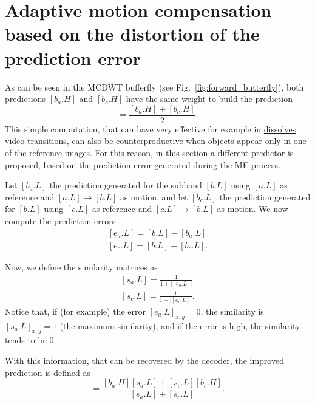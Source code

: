
\section{Adaptive motion compensation based on the distortion of the prediction error}

As can be seen in the MCDWT bufferfly (see
Fig.~\ref{fig:forward_butterfly}), both predictions $[b_a.H]$ and
$[b_c.H]$ have the same weight to build the prediction
\begin{equation}
  [\hat{b.H}] = \frac{[b_a.H] + [b_c.H]}{2}.
\end{equation}
This simple computation, that can have very effective for example in
\href{https://biteable.com/blog/tips/video-transitions-effects-examples/}{dissolves}
video transitions, can also be counterproductive when objects appear
only in one of the reference images. For this reason, in this section
a different predictor is proposed, based on the prediction error
generated during the ME process.

Let $[b_a.L]$ the prediction generated for the subband $[b.L]$ using
$[a.L]$ as reference and $[a.L]\rightarrow [b.L]$ as motion, and let
$[b_c.L]$ the prediction generated for $[b.L]$ using $[c.L]$ as
reference and $[c.L]\rightarrow [b.L]$ as motion. We now compute the
prediction errors
\begin{equation}
  \begin{array}{l}
    {[e_a.L]} = [b.L] - [b_a.L]\\
    {[e_c.L]} = [b.L] - [b_c.L].
  \end{array}
\end{equation}

Now, we define the similarity matrices as
\begin{equation}
  \begin{array}{l}
    {[s_a.L]} = \frac{1}{1+{|[e_a.L]|}}\\
    {[s_c.L]} = \frac{1}{1+{|[e_c.L]|}}.    
  \end{array}
  \label{eq:weighted_prediction}
\end{equation}
Notice that, if (for example) the error $[e_a.L]_{x,y}=0$, the
similarity is $[s_a.L]_{x,y}=1$ (the maximum similarity), and if the
error is high, the similarity tends to be $0$.

With this information, that can be recovered by the decoder, the
improved prediction is defined as
\begin{equation}
  [\hat{b.H}] = \frac{[b_a.H][s_a.L]+[s_c.L][b_c.H]}{[s_a.L]+[s_c.L]}.
\end{equation}

